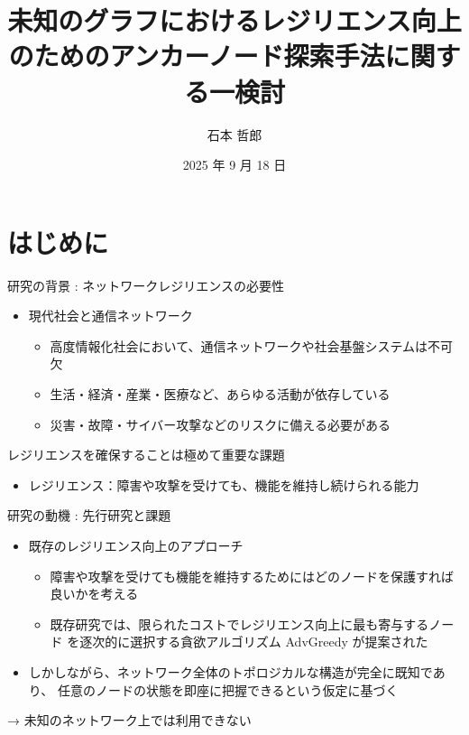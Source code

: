 \documentclass[compress,dvipdfmx,11pt]{beamer}
\title[中間審査]{\bf  未知のグラフにおけるレジリエンス向上のためのアンカーノード探索手法に関する一検討}
\author[]{石本 哲郎}
\institute{関西学院大学 工学部 情報工学課程}
\date{2025 年 9 月 18 日}
\begin{document}
\maketitle

\newcommand{\pivec}{\mathbf \pi}
\newcommand{\xvec}{\mathbf x}
\newcommand{\yvec}{\mathbf y}
\newcommand{\zvec}{\mathbf z}
\newcommand{\Emat}{\mathbf E}
\newcommand{\Imat}{\mathbf I}

\bf
\section{はじめに}
\label{sec:org8d9d03d}
\begin{frame}[label={sec:org3682d4b}]{研究の背景 : ネットワークレジリエンスの必要性}
\begin{itemize}
\item 現代社会と通信ネットワーク
\begin{itemize}
\item 高度情報化社会において、通信ネットワークや社会基盤システムは不可欠
\item 生活・経済・産業・医療など、あらゆる活動が依存している
\item 災害・故障・サイバー攻撃などのリスクに備える必要がある
\end{itemize}
\end{itemize}

\vspace{3mm}

\alert{レジリエンスを確保することは極めて重要な課題}
\begin{itemize}
\item レジリエンス：障害や攻撃を受けても、機能を維持し続けられる能力
\end{itemize}
\end{frame}
\begin{frame}[label={sec:org97a22d9}]{研究の動機 : 先行研究と課題}
\begin{itemize}
\item 既存のレジリエンス向上のアプローチ
\begin{itemize}
\item 障害や攻撃を受けても機能を維持するためにはどのノードを保護すれば良いかを考える
\item 既存研究では、限られたコストでレジリエンス向上に最も寄与するノード
を逐次的に選択する貪欲アルゴリズム AdvGreedy が提案された
\end{itemize}

\item しかしながら、ネットワーク全体のトポロジカルな構造が完全に既知であり、
任意のノードの状態を即座に把握できるという仮定に基づく
\end{itemize}

\vspace{2mm}

→ 未知のネットワーク上では利用できない
\end{frame}
\end{document}
